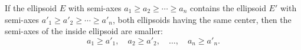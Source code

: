 If the ellipsoid $E$ with semi-axes $a_1 \geq a_2 \geq \cdots \geq a_n$ contains the ellipsoid $E'$ with semi-axes $a'_1 \geq a'_2 \geq \cdots \geq a'_n$, both ellipsoids having the same center, then the semi-axes of the inside ellipsoid are smaller:
$$a_1 \geq a'_1,\quad a_2 \geq a'_2,\quad \ldots,\quad a_n \geq a'_n.$$
